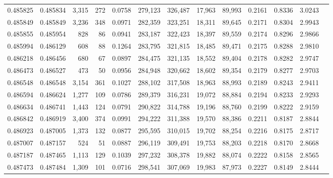 \begin{tabular}{rrrrrrrrrrrrr}
0.485825 & 0.485834 & 3,315 &   272 &                                     0.0758 & 279,123 & 326,487 &  17,963 &  89,993 & 0.2161 & 0.8336 & 3.0243 \\
0.485849 & 0.485849 & 3,236 &   348 &                                     0.0971 & 282,359 & 323,251 &  18,311 &  89,645 & 0.2171 & 0.8304 & 2.9943 \\
0.485855 & 0.485954 &   828 &    86 &                                     0.0941 & 283,187 & 322,423 &  18,397 &  89,559 & 0.2174 & 0.8296 & 2.9866 \\
0.485994 & 0.486129 &   608 &    88 &                                     0.1264 & 283,795 & 321,815 &  18,485 &  89,471 & 0.2175 & 0.8288 & 2.9810 \\
0.486218 & 0.486456 &   680 &    67 &                                     0.0897 & 284,475 & 321,135 &  18,552 &  89,404 & 0.2178 & 0.8282 & 2.9747 \\
0.486473 & 0.486527 &   473 &    50 &                                     0.0956 & 284,948 & 320,662 &  18,602 &  89,354 & 0.2179 & 0.8277 & 2.9703 \\
0.486548 & 0.486548 & 3,154 &   361 &                                     0.1027 & 288,102 & 317,508 &  18,963 &  88,993 & 0.2189 & 0.8243 & 2.9411 \\
0.486594 & 0.486624 & 1,277 &   109 &                                     0.0786 & 289,379 & 316,231 &  19,072 &  88,884 & 0.2194 & 0.8233 & 2.9293 \\
0.486634 & 0.486741 & 1,443 &   124 &                                     0.0791 & 290,822 & 314,788 &  19,196 &  88,760 & 0.2199 & 0.8222 & 2.9159 \\
0.486842 & 0.486919 & 3,400 &   374 &                                     0.0991 & 294,222 & 311,388 &  19,570 &  88,386 & 0.2211 & 0.8187 & 2.8844 \\
0.486923 & 0.487005 & 1,373 &   132 &                                     0.0877 & 295,595 & 310,015 &  19,702 &  88,254 & 0.2216 & 0.8175 & 2.8717 \\
0.487007 & 0.487157 &   524 &    51 &                                     0.0887 & 296,119 & 309,491 &  19,753 &  88,203 & 0.2218 & 0.8170 & 2.8668 \\
0.487187 & 0.487465 & 1,113 &   129 &                                     0.1039 & 297,232 & 308,378 &  19,882 &  88,074 & 0.2222 & 0.8158 & 2.8565 \\
0.487473 & 0.487484 & 1,309 &   101 &                                     0.0716 & 298,541 & 307,069 &  19,983 &  87,973 & 0.2227 & 0.8149 & 2.8444 \\

\end{tabular}
